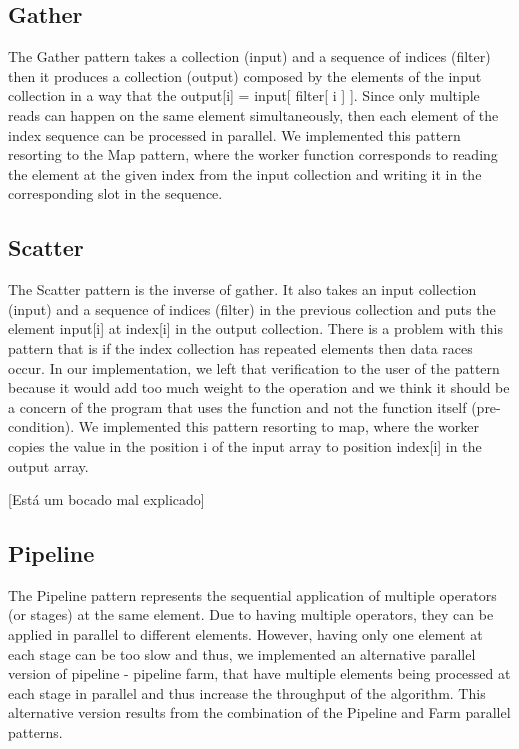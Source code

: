 \documentclass[conference,compsoc]{IEEEtran}
\begin{document}
\subsection{Gather}

The Gather pattern takes a collection (input) and a sequence of indices (filter)  then it produces a collection (output)
composed by the elements of the input collection in a way that the output[i] = input[ filter[ i ] ].
Since only multiple reads can happen on the same element simultaneously, then each element of the index sequence can be processed in parallel.
We implemented this pattern resorting to the Map pattern, where the worker function corresponds to reading the element at the given index from the input collection and writing it in the corresponding slot in the sequence.

\subsection{Scatter}

The Scatter pattern is the inverse of gather. It also takes an input collection (input) and a sequence of indices (filter) in the previous collection and puts
 the element input[i] at index[i] in the output collection. There is a problem with this pattern that is if the index collection
 has repeated elements then data races occur.
  In our implementation, we left that verification to the user of the pattern because it would add too much weight
   to the operation and we think it should be a concern of the program that uses the function and not the function itself (pre-condition).
  We implemented this pattern resorting to map, where the worker copies the value in the position i of the input array to position index[i] in the output array.

[Está um bocado mal explicado]

\subsection{Pipeline}
The Pipeline pattern represents the sequential application of multiple operators (or stages) at the same element. Due to having multiple operators, they can be applied in parallel to different elements. However, having only one element at each stage can be too slow and thus, we implemented an alternative parallel version of pipeline - pipeline farm, that have multiple elements being processed at each stage in parallel and thus increase the throughput of the algorithm. This alternative version results from the combination of the Pipeline and Farm parallel patterns.
\end{document}
